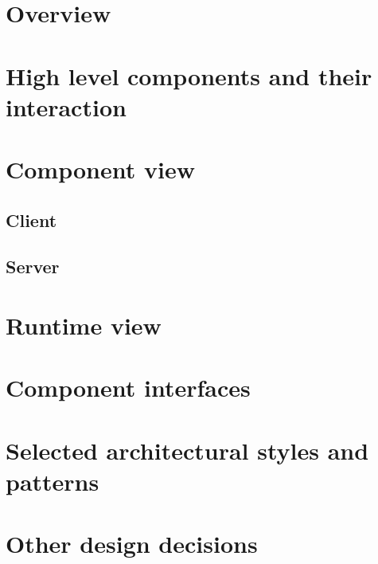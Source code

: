 \section{Overview}

\section{High level components and their interaction}

\section{Component view}
	\subsection{Client}
\subsection{Server}

\section{Runtime view}

\section{Component interfaces}

\section{Selected architectural styles and patterns}

\section{Other design decisions}
